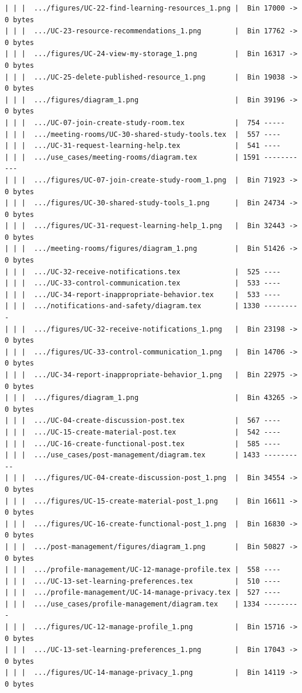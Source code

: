 \documentclass[12pt]{article}
\begin{document}
\begin{lstlisting}[numbers=none,breaklines=true]
| | |  .../figures/UC-22-find-learning-resources_1.png |  Bin 17000 -> 0 bytes
| | |  .../UC-23-resource-recommendations_1.png        |  Bin 17762 -> 0 bytes
| | |  .../figures/UC-24-view-my-storage_1.png         |  Bin 16317 -> 0 bytes
| | |  .../UC-25-delete-published-resource_1.png       |  Bin 19038 -> 0 bytes
| | |  .../figures/diagram_1.png                       |  Bin 39196 -> 0 bytes
| | |  .../UC-07-join-create-study-room.tex            |  754 -----
| | |  .../meeting-rooms/UC-30-shared-study-tools.tex  |  557 ----
| | |  .../UC-31-request-learning-help.tex             |  541 ----
| | |  .../use_cases/meeting-rooms/diagram.tex         | 1591 -----------
| | |  .../figures/UC-07-join-create-study-room_1.png  |  Bin 71923 -> 0 bytes
| | |  .../figures/UC-30-shared-study-tools_1.png      |  Bin 24734 -> 0 bytes
| | |  .../figures/UC-31-request-learning-help_1.png   |  Bin 32443 -> 0 bytes
| | |  .../meeting-rooms/figures/diagram_1.png         |  Bin 51426 -> 0 bytes
| | |  .../UC-32-receive-notifications.tex             |  525 ----
| | |  .../UC-33-control-communication.tex             |  533 ----
| | |  .../UC-34-report-inappropriate-behavior.tex     |  533 ----
| | |  .../notifications-and-safety/diagram.tex        | 1330 ---------
| | |  .../figures/UC-32-receive-notifications_1.png   |  Bin 23198 -> 0 bytes
| | |  .../figures/UC-33-control-communication_1.png   |  Bin 14706 -> 0 bytes
| | |  .../UC-34-report-inappropriate-behavior_1.png   |  Bin 22975 -> 0 bytes
| | |  .../figures/diagram_1.png                       |  Bin 43265 -> 0 bytes
| | |  .../UC-04-create-discussion-post.tex            |  567 ----
| | |  .../UC-15-create-material-post.tex              |  542 ----
| | |  .../UC-16-create-functional-post.tex            |  585 ----
| | |  .../use_cases/post-management/diagram.tex       | 1433 ----------
| | |  .../figures/UC-04-create-discussion-post_1.png  |  Bin 34554 -> 0 bytes
| | |  .../figures/UC-15-create-material-post_1.png    |  Bin 16611 -> 0 bytes
| | |  .../figures/UC-16-create-functional-post_1.png  |  Bin 16830 -> 0 bytes
| | |  .../post-management/figures/diagram_1.png       |  Bin 50827 -> 0 bytes
| | |  .../profile-management/UC-12-manage-profile.tex |  558 ----
| | |  .../UC-13-set-learning-preferences.tex          |  510 ----
| | |  .../profile-management/UC-14-manage-privacy.tex |  527 ----
| | |  .../use_cases/profile-management/diagram.tex    | 1334 ---------
| | |  .../figures/UC-12-manage-profile_1.png          |  Bin 15716 -> 0 bytes
| | |  .../UC-13-set-learning-preferences_1.png        |  Bin 17043 -> 0 bytes
| | |  .../figures/UC-14-manage-privacy_1.png          |  Bin 14119 -> 0 bytes

\end{lstlisting}
\end{document}
